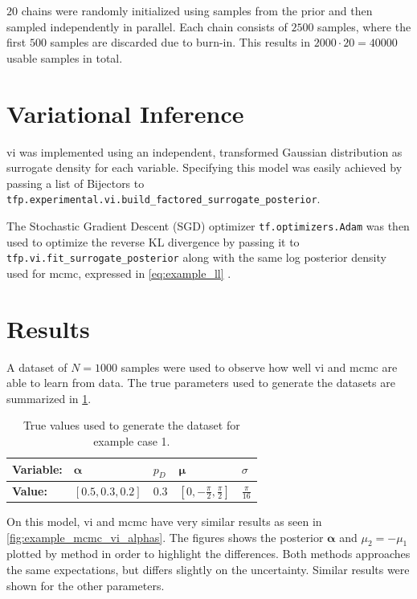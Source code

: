 $20$ chains were randomly initialized using samples from the prior and then sampled independently in parallel. Each chain consists of $2500$ samples, where the first $500$ samples are discarded due to burn-in. This results in $2000 \cdot 20 = 40000$ usable samples in total. 

\section{Variational Inference}

\acrshort{vi} was implemented using an independent, transformed Gaussian distribution as surrogate density for each variable. Specifying this model was easily achieved by passing a list of Bijectors to \texttt{tfp.experimental.vi.build\_factored\_surrogate\_posterior}. 

The Stochastic Gradient Descent (SGD) optimizer \texttt{tf.optimizers.Adam} was then used to optimize the reverse KL divergence by passing it to \texttt{tfp.vi.fit\_surrogate\_posterior} along with the same log posterior density used for \acrshort{mcmc}, expressed in \cref{eq:example_ll} \cite{tensorflow2015-whitepaper}. 

\section{Results}
A dataset of $N=1000$ samples were used to observe how well \acrshort{vi} and \acrshort{mcmc} are able to learn from data. The true parameters used to generate the datasets are summarized in \cref{tbl:example_params}.
\begin{table}[h]
\centering
\begin{tabular}{lllll}
\textbf{Variable:}   & $\boldsymbol{\alpha}$ & $p_D$ & $\boldsymbol{\mu}$                  & $\sigma$         \\ \hline
\textbf{Value:} & $[0.5, 0.3, 0.2]$     & $0.3$ & $[0, -\frac{\pi}{2}, \frac{\pi}{2}]$ & $\frac{\pi}{16}$ \\
\end{tabular}
\caption{True values used to generate the dataset for example case 1.}
\label{tbl:example_params}
\end{table}

On this model, \acrshort{vi} and \acrshort{mcmc} have very similar results as seen in \cref{fig:example_mcmc_vi_alphas}. The figures shows the posterior $\boldsymbol{\alpha}$ and $\mu_2=-\mu_1$ plotted by method in order to highlight the differences. Both methods approaches the same expectations, but differs slightly on the uncertainty. Similar results were shown for the other parameters. 

